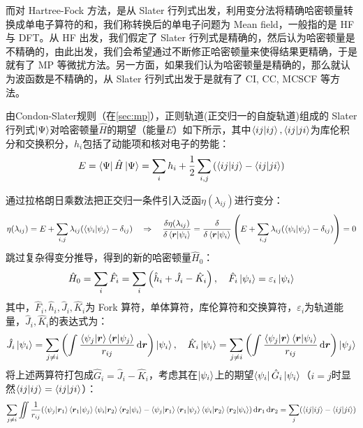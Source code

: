 而对 Hartree-Fock 方法，是从 Slater 行列式出发，利用变分法将精确哈密顿量转换成单电子算符的和，我们称转换后的单电子问题为 Mean field，一般指的是 HF 与 DFT。从 HF 出发，我们假定了 Slater 行列式是精确的，然后认为哈密顿量是不精确的，由此出发，我们会希望通过不断修正哈密顿量来使得结果更精确，于是就有了 MP 等微扰方法。另一方面，如果我们认为哈密顿量是精确的，那么就认为波函数是不精确的，从 Slater 行列式出发于是就有了 CI, CC, MCSCF 等方法。

由Condon-Slater规则（在\ref{sec:mp}），正则轨道(正交归一的自旋轨道)组成的 Slater 行列式$\ket{\Psi}$对哈密顿量$\hat{H}$的期望（能量$E$）如下所示，其中$\bra{ij}\ket{ij},\bra{ij}\ket{ji}$为库伦积分和交换积分，$h_i$包括了动能项和核对电子的势能：
\[E=\bra{\Psi}\hat{H}\ket{\Psi}=\sum_ih_i+\frac{1}{2}\sum_{i,j}\left(\bra{ij}\ket{ij}-\bra{ij}\ket{ji}\right)\]

通过拉格朗日乘数法把正交归一条件引入泛函$\eta(\lambda_{ij})$进行变分：
\[\eta(\lambda_{ij})=E+\sum_{i,j}\lambda_{ij}(\bra{\psi_i}\ket{\psi_j}-\delta_{ij}) \quad \Rightarrow \quad \frac{\delta\eta(\lambda_{ij})}{\delta \bra{\bm{r}}\ket{\psi_i}}=\frac{\delta}{\delta \bra{\bm{r}}\ket{\psi_i}}\left(E+\sum_{i,j}\lambda_{ij}(\bra{\psi_i}\ket{\psi_j}-\delta_{ij})\right)=0\]
跳过复杂得变分推导，得到的新的哈密顿量$\hat{H}_0$：
\[\hat{H}_0=\sum_i\hat{F}_i=\sum_i\left(\hat{h}_i+\hat{J}_i-\hat{K}_i\right), \quad \hat{F}_i\ket{\psi_i}=\varepsilon_i\ket{\psi_i}\]
其中，$\hat{F}_i,\hat{h}_i,\hat{J}_i,\hat{K}_i$为 Fork 算符，单体算符，库伦算符和交换算符，$\varepsilon_i$为轨道能量，$\hat{J}_i,\hat{K}_i$的表达式为：
\[\hat{J}_i\ket{\psi_i} = \sum_{j \neq i}\left(\int\frac{\bra{\psi_j}\ket{\bm{r}}\bra{\bm{r}}\ket{\psi_j}}{r_{ij}}\dd{\bm{r}}\right)\ket{\psi_i}, \quad \hat{K}_i\ket{\psi_i} = \sum_{j \neq i}\left(\int\frac{\bra{\psi_j}\ket{\bm{r}}\bra{\bm{r}}\ket{\psi_i}}{r_{ij}}\dd{\bm{r}}\right)\ket{\psi_j}\]
将上述两算符打包成$\hat{G}_i=\hat{J}_i-\hat{K}_i$，考虑其在$\ket{\psi_i}$上的期望$\bra{\psi_i}\hat{G}_i\ket{\psi_i}$（$i=j$时显然$\bra{ij}\ket{ij}=\bra{ij}\ket{ji}$）：
\[\sum_{j\neq i}\iint\frac{1}{r_{ij}}(\bra{\psi_j}\ket{\bm{r}_1}\bra{\bm{r}_1}\ket{\psi_j}\bra{\psi_i}\ket{\bm{r}_2}\bra{\bm{r}_2}\ket{\psi_i}-\bra{\psi_j}\ket{\bm{r}_1}\bra{\bm{r}_1}\ket{\psi_j}\bra{\psi_i}\ket{\bm{r}_2}\bra{\bm{r}_2}\ket{\psi_i})\dd{\bm{r}_1}\dd{\bm{r}_2}=\sum_{j}(\bra{ij}\ket{ij}-\bra{ij}\ket{ji})\]

